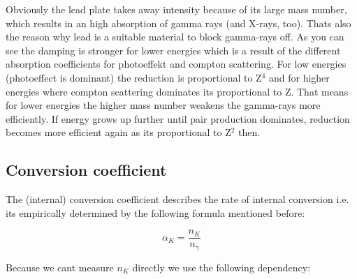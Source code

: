 \documentclass[bigchapter,colorback,accentcolor=tud4b,linedtoc,11pt]{tudreport}
\begin{document}
\begin{center}
\begin{figure}[H]
\end{figure}
\end{center}

Obviously the lead plate takes away intensity because of its large mass number, which results in an high absorption of gamma rays (and X-rays, too). Thats also the reason why lead is a suitable material to block gamma-rays off. As you can see the damping is stronger for lower energies which is a result of the different absorption coefficients for photoeffekt and compton scattering. For low energies (photoeffect is dominant) the reduction is proportional to Z$^4$ and for higher energies where compton scattering dominates its proportional to Z. That means for lower energies the higher mass number weakens the gamma-rays more efficiently. If energy grows up further until pair production dominates, reduction becomes more efficient again as its proportional to Z$^2$ then.

\subsection{Conversion coefficient}

The (internal) conversion coefficient describes the rate of internal conversion i.e. its empirically determined by the following formula mentioned before:

$$\alpha_K = \frac{n_K}{n_{\gamma}}$$

Because we cant measure $n_K$ directly we use the following dependency:
\end{document}
